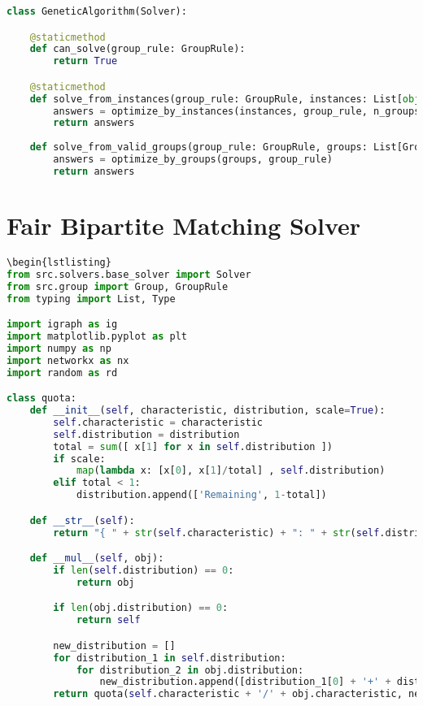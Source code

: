 \begin{apendicesenv}
\begin{lstlisting}[language=Python, caption={Genetic Algorithm Solver Source Code}]
class GeneticAlgorithm(Solver):

    @staticmethod
    def can_solve(group_rule: GroupRule):
        return True

    @staticmethod
    def solve_from_instances(group_rule: GroupRule, instances: List[object]):
        answers = optimize_by_instances(instances, group_rule, n_groups=len(instances))
        return answers
    
    def solve_from_valid_groups(group_rule: GroupRule, groups: List[Group]):
        answers = optimize_by_groups(groups, group_rule)
        return answers
\end{lstlisting}

\chapter{Fair Bipartite Matching Solver}
\label{app:solver_fair}
\begin{lstlisting}[language=Python, caption={Fair Bipartite Matching Solver Source Code}]
\begin{lstlisting}
from src.solvers.base_solver import Solver
from src.group import Group, GroupRule
from typing import List, Type

import igraph as ig
import matplotlib.pyplot as plt
import numpy as np
import networkx as nx
import random as rd

class quota:
    def __init__(self, characteristic, distribution, scale=True):
        self.characteristic = characteristic
        self.distribution = distribution
        total = sum([ x[1] for x in self.distribution ])
        if scale:
            map(lambda x: [x[0], x[1]/total] , self.distribution)
        elif total < 1:
            distribution.append(['Remaining', 1-total])

    def __str__(self):
        return "{ " + str(self.characteristic) + ": " + str(self.distribution) + " }"

    def __mul__(self, obj):
        if len(self.distribution) == 0:
            return obj 

        if len(obj.distribution) == 0:
            return self

        new_distribution = []
        for distribution_1 in self.distribution:
            for distribution_2 in obj.distribution:
                new_distribution.append([distribution_1[0] + '+' + distribution_2[0], distribution_1[1] * distribution_2[1]])
        return quota(self.characteristic + '/' + obj.characteristic, new_distribution)


\end{lstlisting}
\end{apendicesenv}
